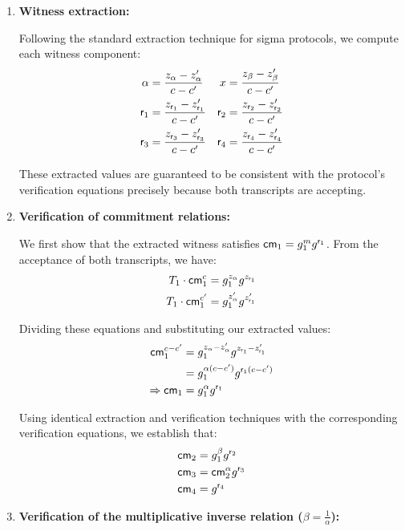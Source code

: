 \begin{enumerate}
    \item \textbf{Witness extraction:}
    
    Following the standard extraction technique for sigma protocols, we compute each witness component:
    \begin{align}
    \alpha &= \frac{z_\alpha - z'_\alpha}{c - c'} & x &= \frac{z_\beta - z'_\beta}{c - c'} \\
    \mathsf{r}_1 &= \frac{z_{\mathsf{r}_1} - z'_{\mathsf{r}_1}}{c - c'} & \mathsf{r}_2 &= \frac{z_{\mathsf{r}_2} - z'_{\mathsf{r}_2}}{c - c'} \\
    \mathsf{r}_3 &= \frac{z_{\mathsf{r}_3} - z'_{\mathsf{r}_3}}{c - c'} & \mathsf{r}_4 &= \frac{z_{\mathsf{r}_4} - z'_{\mathsf{r}_4}}{c - c'}
    \end{align}
    
    These extracted values are guaranteed to be consistent with the protocol's verification equations precisely because both transcripts are accepting.
    
    \item \textbf{Verification of commitment relations:}
    
    We first show that the extracted witness satisfies $\mathsf{cm}_1 = g_1^m g^{\mathsf{r}_1}$. From the acceptance of both transcripts, we have:
    \begin{align}
        T_1 \cdot \mathsf{cm}_1^c &= g_1^{z_\alpha} g^{z_{\mathsf{r}_1}} \\
        T_1 \cdot \mathsf{cm}_1^{c'} &= g_1^{z'_\alpha} g^{z'_{\mathsf{r}_1}}
    \end{align}
    
    Dividing these equations and substituting our extracted values:
    \begin{align}
        \mathsf{cm}_1^{c-c'} &= g_1^{z_\alpha-z'_\alpha} g^{z_{\mathsf{r}_1}-z'_{\mathsf{r}_1}} \\
        &= g_1^{\alpha(c-c')} g^{\mathsf{r}_1(c-c')} \\
        \Rightarrow \mathsf{cm}_1 &= g_1^\alpha g^{\mathsf{r}_1}
    \end{align}
    
    Using identical extraction and verification techniques with the corresponding verification equations, we establish that:
    \begin{align}
        \mathsf{cm}_2 &= g_1^\beta g^{\mathsf{r}_2} \\
        \mathsf{cm}_3 &= \mathsf{cm}_2^\alpha g^{\mathsf{r}_3} \\
        \mathsf{cm}_4 &= g^{\mathsf{r}_4}
    \end{align}
    
    \item \textbf{Verification of the multiplicative inverse relation ($\beta = \frac{1}{\alpha}$):}
    

\end{enumerate}
